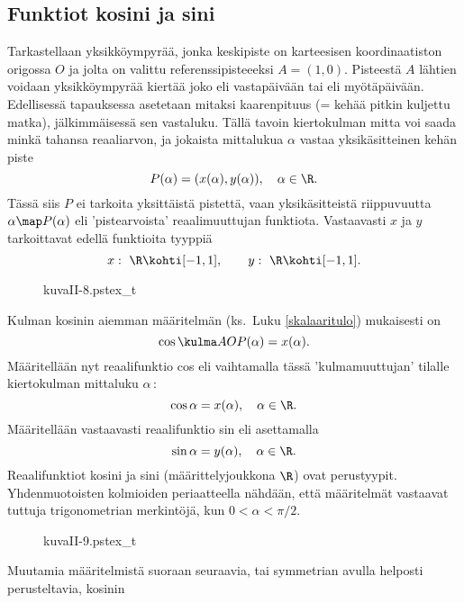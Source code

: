 \pagebreak

\subsection*{Funktiot kosini ja sini}

Tarkastellaan yksikköympyrää, jonka keskipiste on karteesisen koordinaatiston origossa $O$ ja
jolta on valittu referenssipisteeeksi $A=(1,0)$. Pisteestä $A$ lähtien voidaan yksikköympyrää
kiertää joko  eli vastapäivään tai
 eli myötäpäivään. Edellisessä tapauksessa asetetaan
 mitaksi kaarenpituus (= kehää pitkin kuljettu matka), jälkimmäisessä sen
vastaluku. Tällä tavoin kiertokulman mitta voi saada minkä tahansa reaaliarvon, ja jokaista
mittalukua $\alpha$ vastaa yksikäsitteinen kehän piste
\[
P(\alpha)=(x(\alpha),y(\alpha)), \quad \alpha \in \R.
\]
Tässä siis $P$ ei tarkoita yksittäistä pistettä, vaan yksikäsitteistä riippuvuutta 
$\alpha \map P(\alpha)$ eli 'pistearvoista' reaalimuuttujan funktiota. Vastaavasti $x$ ja $y$
tarkoittavat edellä funktioita tyyppiä
\[
x: \ \R \kohti [-1,1], \qquad y: \ \R \kohti [-1,1].
\]
\begin{figure}[H]
\begin{center}
{kuvaII-8.pstex_t}
\end{center}
\end{figure}
Kulman kosinin aiemman määritelmän (ks.\ Luku \ref{skalaaritulo}) mukaisesti on
\[
\cos\kulma AOP(\alpha) = x(\alpha).
\]
Määritellään nyt reaalifunktio cos eli  vaihtamalla tässä
'kulmamuuttujan' tilalle kiertokulman mittaluku $\alpha$\,:
\[
\cos\alpha = x(\alpha), \quad \alpha\in\R.
\]
Määritellään vastaavasti reaalifunktio sin eli  asettamalla
\[
\sin\alpha = y(\alpha), \quad \alpha \in \R. 
\]
Reaalifunktiot kosini ja sini (määrittelyjoukkona $\R$) ovat 
perustyypit. Yhdenmuotoisten kolmioiden periaatteella nähdään, että määritelmät vastaavat 
tuttuja trigonometrian merkintöjä, kun $0 < \alpha < \pi/2$.
\begin{figure}[H]
\begin{center}
{kuvaII-9.pstex_t}
\end{center}
\end{figure}
Muutamia määritelmistä suoraan seuraavia, tai symmetrian avulla helposti perusteltavia, kosinin
